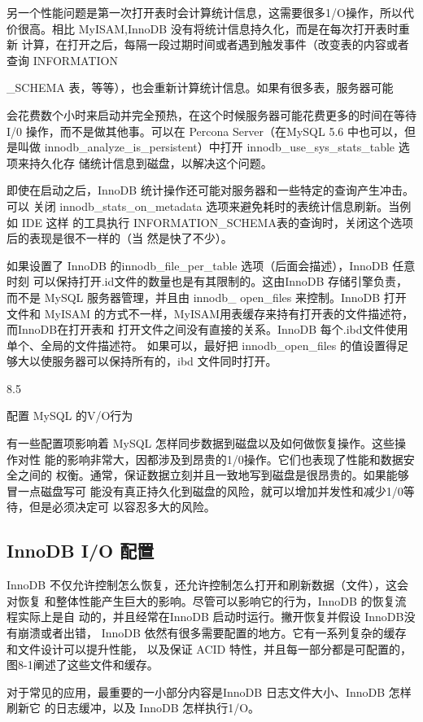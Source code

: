另一个性能问题是第一次打开表时会计算统计信息，这需要很多1/O操作，所以代
价很高。相比 MyISAM,InnoDB 没有将统计信息持久化，而是在每次打开表时重新
计算，在打开之后，每隔一段过期时间或者遇到触发事件（改变表的内容或者查询
INFORMATION

\_SCHEMA 表，等等），也会重新计算统计信息。如果有很多表，服务器可能

会花费数个小时来启动并完全预热，在这个时候服务器可能花费更多的时间在等待I/0
操作，而不是做其他事。可以在 Percona Server（在MySQL 5.6 中也可以，但是叫做
innodb\_analyze\_is\_persistent）中打开 innodb\_use\_sys\_stats\_table 选项来持久化存
储统计信息到磁盘，以解决这个问题。

即使在启动之后，InnoDB 统计操作还可能对服务器和一些特定的查询产生冲击。可以
关闭 innodb\_stats\_on\_metadata 选项来避免耗时的表统计信息刷新。当例如 IDE 这样
的工具执行 INFORMATION\_SCHEMA表的查询时，关闭这个选项后的表现是很不一样的（当
然是快了不少）。

如果设置了 InnoDB 的innodb\_file\_per\_table 选项（后面会描述），InnoDB 任意时刻
可以保持打开.id文件的数量也是有其限制的。这由InnoDB 存储引擎负责，而不是
MySQL 服务器管理，并且由 innodb\_ open\_files 来控制。InnoDB 打开文件和 MyISAM
的方式不一样，MyISAM用表缓存来持有打开表的文件描述符，而InnoDB在打开表和
打开文件之间没有直接的关系。InnoDB 每个.ibd文件使用单个、全局的文件描述符。
如果可以，最好把 innodb\_open\_files 的值设置得足够大以使服务器可以保持所有的，ibd
文件同时打开。

8.5

配置 MySQL 的V/O行为

有一些配置项影响着 MySQL 怎样同步数据到磁盘以及如何做恢复操作。这些操作对性
能的影响非常大，因都涉及到昂贵的1/0操作。它们也表现了性能和数据安全之间的
权衡。通常，保证数据立刻并且一致地写到磁盘是很昂贵的。如果能够冒一点磁盘写可
能没有真正持久化到磁盘的风险，就可以增加并发性和减少1/0等待，但是必须决定可
以容忍多大的风险。

\subsection{InnoDB I/O 配置}
InnoDB 不仅允许控制怎么恢复，还允许控制怎么打开和刷新数据（文件），这会对恢复
和整体性能产生巨大的影响。尽管可以影响它的行为，InnoDB 的恢复流程实际上是自
动的，并且经常在InnoDB 启动时运行。撇开恢复并假设 InnoDB没有崩溃或者出错，
InnoDB 依然有很多需要配置的地方。它有一系列复杂的缓存和文件设计可以提升性能，
以及保证 ACID 特性，并且每一部分都是可配置的，图8-1阐述了这些文件和缓存。

对于常见的应用，最重要的一小部分内容是InnoDB 日志文件大小、InnoDB 怎样刷新它
的日志缓冲，以及 InnoDB 怎样执行1/O。

